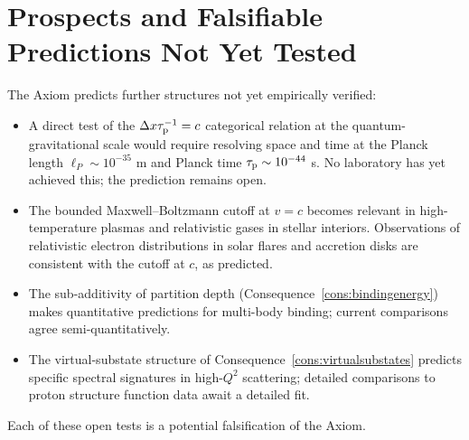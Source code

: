 \section{Prospects and Falsifiable Predictions Not Yet Tested}
\label{sec:prospects-ch25}

The Axiom predicts further structures not yet empirically verified:

\begin{itemize}
  \item A direct test of the $\Delta x\tau_{\mathrm{p}}^{-1}=c$ categorical relation at
    the quantum-gravitational scale would require resolving space and time at
    the Planck length $\ell_{P}\sim 10^{-35}$ m and Planck time
    $\tau_{\mathrm{p}}\sim 10^{-44}$ s.  No laboratory has yet achieved this; the
    prediction remains open.
  \item The bounded Maxwell--Boltzmann cutoff at $v=c$ becomes relevant in
    high-temperature plasmas and relativistic gases in stellar interiors.
    Observations of relativistic electron distributions in solar flares and
    accretion disks are consistent with the cutoff at $c$, as predicted.
  \item The sub-additivity of partition depth
    (Consequence~\ref{cons:bindingenergy}) makes quantitative predictions for
    multi-body binding; current comparisons agree semi-quantitatively.
  \item The virtual-substate structure of Consequence~\ref{cons:virtualsubstates}
    predicts specific spectral signatures in high-$Q^{2}$ scattering; detailed
    comparisons to proton structure function data await a detailed fit.
\end{itemize}

Each of these open tests is a potential falsification of the Axiom.
